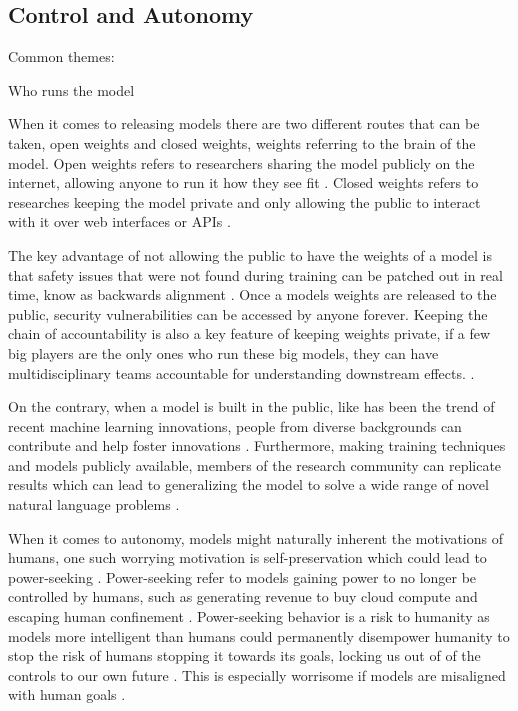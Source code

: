 \subsection{Control and Autonomy}

Common themes:

Who runs the model

When it comes to releasing models there are two different routes that can be taken, open weights and closed weights, weights referring to the brain of the model. Open weights refers to researchers sharing the model publicly on the internet, allowing anyone to run it how they see fit \citep{manchanda_open_2025}. Closed weights refers to researches keeping the model private and only allowing the public to interact with it over web interfaces or APIs \citep{manchanda_open_2025}. 

The key advantage of not allowing the public to have the weights of a model is that safety issues that were not found during training can be patched out in real time, know as backwards alignment \citep{ji_ai_2023}. Once a models weights are released to the public, security vulnerabilities can be accessed by anyone forever. Keeping the chain of accountability is also a key feature of keeping weights private, if a few big players are the only ones who run these big models, they can have multidisciplinary teams accountable for understanding downstream effects. \citep{solaiman_gradient_2023}. 

On the contrary, when a model is built in the public, like has been the trend of recent machine learning innovations, people from diverse backgrounds can contribute and help foster innovations \citep{eiras_near_2024}. Furthermore, making training techniques and models publicly available, members of the research community can replicate results which can lead to generalizing the model to solve a wide range of novel natural language problems \citep{manchanda_open_2025}.

When it comes to autonomy, models might naturally inherent the motivations of humans, one such worrying motivation is self-preservation which could lead to power-seeking \citep{bostrom_superintelligent_2012}. Power-seeking refer to models gaining power to no longer be controlled by humans, such as generating revenue to buy cloud compute and escaping human confinement \citep{shevlane_model_2023}. Power-seeking behavior is a risk to humanity as models more intelligent than humans could permanently disempower humanity to stop the risk of humans stopping it towards its goals, locking us out of of the controls to our own future \citep{carlsmith_is_2024}. This is especially worrisome if models are misaligned with human goals \citep{carlsmith_is_2024}. 

